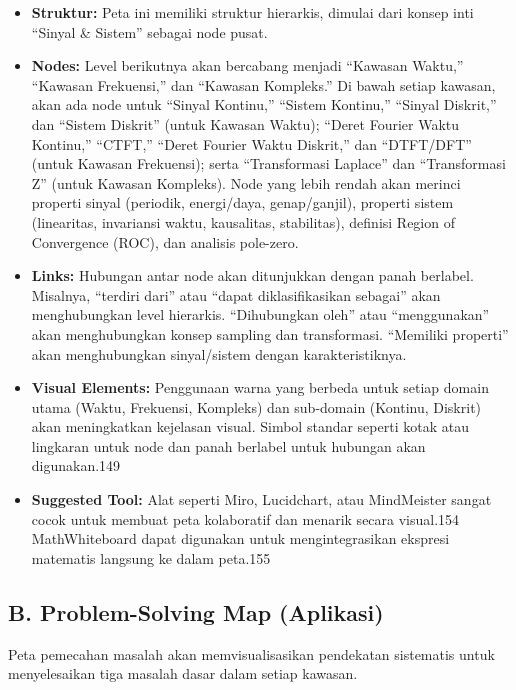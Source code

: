 \documentclass[
  letterpaper,
  DIV=11,
  numbers=noendperiod]{scrreprt}
\begin{document}
\begin{itemize}
\item
  \textbf{Struktur:} Peta ini memiliki struktur hierarkis, dimulai dari
  konsep inti ``Sinyal \& Sistem'' sebagai node pusat.
\item
  \textbf{Nodes:} Level berikutnya akan bercabang menjadi ``Kawasan
  Waktu,'' ``Kawasan Frekuensi,'' dan ``Kawasan Kompleks.'' Di bawah
  setiap kawasan, akan ada node untuk ``Sinyal Kontinu,'' ``Sistem
  Kontinu,'' ``Sinyal Diskrit,'' dan ``Sistem Diskrit'' (untuk Kawasan
  Waktu); ``Deret Fourier Waktu Kontinu,'' ``CTFT,'' ``Deret Fourier
  Waktu Diskrit,'' dan ``DTFT/DFT'' (untuk Kawasan Frekuensi); serta
  ``Transformasi Laplace'' dan ``Transformasi Z'' (untuk Kawasan
  Kompleks). Node yang lebih rendah akan merinci properti sinyal
  (periodik, energi/daya, genap/ganjil), properti sistem (linearitas,
  invariansi waktu, kausalitas, stabilitas), definisi Region of
  Convergence (ROC), dan analisis pole-zero.
\item
  \textbf{Links:} Hubungan antar node akan ditunjukkan dengan panah
  berlabel. Misalnya, ``terdiri dari'' atau ``dapat diklasifikasikan
  sebagai'' akan menghubungkan level hierarkis. ``Dihubungkan oleh''
  atau ``menggunakan'' akan menghubungkan konsep sampling dan
  transformasi. ``Memiliki properti'' akan menghubungkan sinyal/sistem
  dengan karakteristiknya.
\item
  \textbf{Visual Elements:} Penggunaan warna yang berbeda untuk setiap
  domain utama (Waktu, Frekuensi, Kompleks) dan sub-domain (Kontinu,
  Diskrit) akan meningkatkan kejelasan visual. Simbol standar seperti
  kotak atau lingkaran untuk node dan panah berlabel untuk hubungan akan
  digunakan.149
\item
  \textbf{Suggested Tool:} Alat seperti Miro, Lucidchart, atau
  MindMeister sangat cocok untuk membuat peta kolaboratif dan menarik
  secara visual.154 MathWhiteboard dapat digunakan untuk
  mengintegrasikan ekspresi matematis langsung ke dalam peta.155
\end{itemize}

\subsection{B. Problem-Solving Map
(Aplikasi)}\label{b.-problem-solving-map-aplikasi}

Peta pemecahan masalah akan memvisualisasikan pendekatan sistematis
untuk menyelesaikan tiga masalah dasar dalam setiap kawasan.
\end{document}
